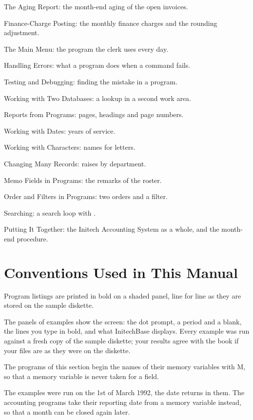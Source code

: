 The Aging Report: the month-end aging of the open invoices.

Finance-Charge Posting: the monthly finance charges and
the rounding adjustment.

The Main Menu: the program the clerk uses every day.

Handling Errors: what a program does when a command
fails.

Testing and Debugging: finding the mistake in a program.

Working with Two Databases: a lookup in a second work
area.

Reports from Programs: pages, headings and page numbers.

Working with Dates: years of service.

Working with Characters: names for letters.

Changing Many Records: raises by department.

Memo Fields in Programs: the remarks of the roster.

Order and Filters in Programs: two orders and a filter.

Searching: a search loop with .

Putting It Together: the Initech Accounting System as a
whole, and the month-end procedure.

\section{Conventions Used in This Manual}
Program listings are printed in bold on a shaded panel,
line for line as they are stored on the sample diskette.

The panels of examples show the screen: the dot prompt, a
period and a blank, the lines you type in bold, and what InitechBase displays.
Every example was run against a fresh copy of the sample diskette; your
results agree with the book if your files are as they were on the diskette.

The programs of this section begin the names of their memory
variables with M, so that a memory variable is never taken for a field.

The examples were run on the 1st of March 1992, the date
 returns in them.  The accounting programs take their reporting
date from a memory variable instead, so that a month can be closed again
later.
